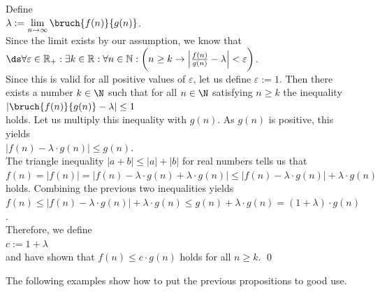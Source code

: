 \proof
Define \\[0.2cm]
\hspace*{1.3cm}
$\lambda := \lim\limits_{n \rightarrow \infty} \bruch{f(n)}{g(n)}$.  
\\[0.2cm]
Since the limit exists by our assumption, we know that
\\[0.2cm]
\hspace*{1.3cm}
$\ds\forall \varepsilon \in \mathbb{R}_+:\exists k \in \mathbb{R}: \forall n \in \mathbb{N}: 
 \biggl(n \geq k \rightarrow \Bigl| \frac{f(n)}{g(n)} - \lambda \Bigr| < \varepsilon \biggr)
$.
\\[0.2cm]
Since this is valid for all positive values of $\varepsilon$, let us define $\varepsilon := 1$. 
Then there exists a number $k \in \N$ such that
for all $n\in \N$ satisfying $n \geq k$ the inequality 
\\[0.2cm]
\hspace*{1.3cm}
$\left| \bruch{f(n)}{g(n)} - \lambda \right| \leq 1$ 
\\[0.2cm]
holds.  Let us multiply this inequality with $g(n)$.  As $g(n)$ is positive, this yields
\\[0.2cm]
\hspace*{1.3cm}
$|f(n) - \lambda \cdot g(n)| \leq g(n)$. 
\\[0.2cm]
The triangle inequality $|a + b| \leq |a| + |b|$ for real numbers tells us that 
\\[0.2cm]
\hspace*{1.3cm}
$f(n) =    \bigl|f(n)\bigr|
      =    \bigl|f(n) - \lambda \cdot g(n) + \lambda \cdot g(n)\bigr|
      \leq \bigl|f(n) - \lambda \cdot g(n)\bigr| + \lambda \cdot g(n)$ 
\\[0.2cm]
holds.  Combining the previous two inequalities yields
\\[0.2cm]
\hspace*{1.3cm}
$f(n) \leq \bigl|f(n) - \lambda \cdot g(n)\bigr| + \lambda \cdot g(n)
      \leq g(n) + \lambda \cdot g(n)
       =   (1 + \lambda) \cdot g(n)
$.
\\[0.2cm]
Therefore, we define
\\[0.2cm]
\hspace*{1.3cm}
 $c := 1 +  \lambda$
\\[0.2cm] 
and have shown that $f(n) \leq c \cdot g(n)$ holds for all $n \geq k$. \qed
\vspace*{0.3cm}

\noindent
The following examples show how to put the previous propositions to good use.

